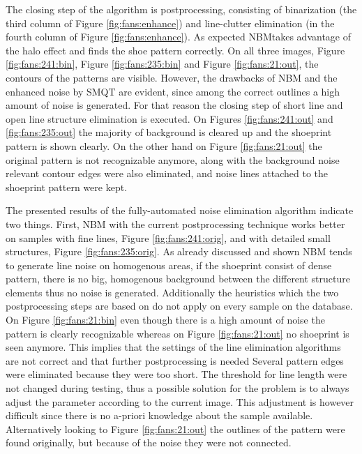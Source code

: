 \documentclass[draft,final]{vutinfth} %
\begin{document}
\par
The closing step of the algorithm is postprocessing, consisting of binarization (the third column of Figure \ref{fig:fans:enhance}) and line-clutter elimination (in the fourth column of Figure \ref{fig:fans:enhance}).
As expected NBMtakes advantage of the halo effect and finds the shoe pattern correctly. 
On all three images, Figure \ref{fig:fans:241:bin}, Figure \ref{fig:fans:235:bin} and Figure \ref{fig:fans:21:out}, the contours of the patterns are visible.
However, the drawbacks of NBM and the enhanced noise by SMQT are evident, since among the correct outlines a high amount of noise is generated.
For that reason the closing step of short line and open line structure elimination is executed.
On Figures \ref{fig:fans:241:out} and \ref{fig:fans:235:out} the majority of background is cleared up and the shoeprint pattern is shown clearly.
On the other hand on Figure \ref{fig:fans:21:out} the original pattern is not recognizable anymore, along with the background noise relevant contour edges were also eliminated, and noise lines attached to the shoeprint pattern were kept.
\par
The presented results of the fully-automated noise elimination algorithm indicate two things.
First, NBM with the current postprocessing technique works better on samples with fine lines, Figure \ref{fig:fans:241:orig}, and with detailed small structures, Figure \ref{fig:fans:235:orig}.
As already discussed and shown NBM tends to generate line noise on homogenous areas, if the shoeprint consist of dense pattern, there is no big, homogenous background between the different structure elements thus no noise is generated.
Additionally the heuristics which the two postprocessing steps are based on do not apply on every sample on the database.
On Figure  \ref{fig:fans:21:bin} even though there is a high amount of noise the pattern is clearly recognizable whereas on Figure \ref{fig:fans:21:out} no shoeprint is seen anymore.
This implies that the settings of the line elimination algorithms are not correct and that further postprocessing is needed
Several pattern edges were eliminated because they were too short.
The threshold for line length were not changed during testing, thus a possible solution for the problem is to always adjust the parameter according to the current image.
This adjustment is however difficult since there is no a-priori knowledge about the sample available.
Alternatively looking to Figure  \ref{fig:fans:21:out} the outlines of the pattern were found originally, but because of the noise they were not connected.
\end{document}
